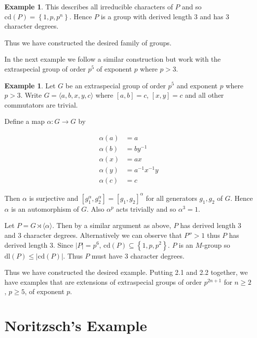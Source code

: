 \documentclass[]{amsart}
\theoremstyle{definition}
\theoremstyle{definition}
\theoremstyle{definition}
\newtheorem{ex}[theorem]{Example}
\theoremstyle{definition}
\theoremstyle{remark}
\theoremstyle{remark}
\newcommand{\abs}[1]{\left\lvert{#1}\right\rvert}
\newcommand{\set}[1]{\left\{{#1}\right\}}
\begin{document}
\begin{ex}
            This describes all irreducible characters of $P$ and so $\mathrm{cd}(P)=\set{1,p,p^n}$. Hence $P$ is a group with derived length 3 and has 3 character degrees. 

            Thus we have constructed the desired family of groups.

            
        \end{ex}
        In the next example we follow a similar construction but work with the extraspecial group of order $p^5$ of exponent $p$ where $p>3$.
        
        \begin{ex}
            Let $G$ be an extraspecial group of order $p^5$ and exponent $p$ where $p>3$. Write $G=\langle a,b,x,y,c\rangle$ where $[a,b]=c$, $[x,y]=c$ and all other commutators are trivial. 

            Define a map $\alpha : G\to G$ by 
            
            \begin{align*} 
                \alpha(a)&=a\\
                \alpha(b)&=by^{-1}\\
                \alpha(x)&=ax\\
                \alpha(y)&=a^{-1}x^{-1}y\\
                \alpha(c)&=c
            \end{align*}

            Then $\alpha$ is surjective and $[g_1^{\alpha},g_2^{\alpha}]=[g_1,g_2]^{\alpha}$ for all generators $g_1,g_2$ of $G$. Hence $\alpha$ is an automorphism of $G$. Also $\alpha^p$ acts trivially and so $\alpha^3=1$. 
            
            Let $P=G\rtimes \langle \alpha \rangle$. Then by a similar argument as above, $P$ has derived length 3 and 3 character degrees. Alternatively we can observe that $P''>1$ thus $P$ has derived length $3$. Since $\abs{P}=p^6$,  $\mathrm{cd} (P)\subseteq \set{1,p,p^2}$. $P$ is an $M$-group so $\mathrm{dl}(P)\leq \abs{\mathrm{cd}(P)}$. Thus $P$ must have 3 character degrees.

            Thus we have constructed the desired example. Putting 2.1 and 2.2 together, we have examples that are extensions of extraspecial groups of order $p^{2n+1}$ for $n\geq 2$, $p\geq 5$, of exponent $p$.

        \end{ex}
        

    \section{Noritzsch's Example}
\end{document}
